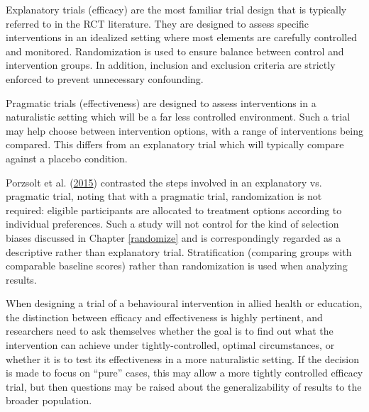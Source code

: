 \documentclass{krantz}
\begin{document}
Explanatory trials (efficacy) are the most familiar trial design that is typically referred to in the RCT literature. They are designed to assess specific interventions in an idealized setting where most elements are carefully controlled and monitored. Randomization is used to ensure balance between control and intervention groups. In addition, inclusion and exclusion criteria are strictly enforced to prevent unnecessary confounding.

Pragmatic trials (effectiveness) are designed to assess interventions in a naturalistic setting which will be a far less controlled environment. Such a trial may help choose between intervention options, with a range of interventions being compared. This differs from an explanatory trial which will typically compare against a placebo condition.

Porzsolt et al. (\protect\hyperlink{ref-porzsolt2015}{2015}) contrasted the steps involved in an explanatory vs. pragmatic trial, noting that with a pragmatic trial, randomization is not required: eligible participants are allocated to treatment options according to individual preferences. Such a study will not control for the kind of selection biases discussed in Chapter \ref{randomize} and is correspondingly regarded as a descriptive rather than explanatory trial. Stratification (comparing groups with comparable baseline scores) rather than randomization is used when analyzing results. 

When designing a trial of a behavioural intervention in allied health or education, the distinction between efficacy and effectiveness is highly pertinent, and researchers need to ask themselves whether the goal is to find out what the intervention can achieve under tightly-controlled, optimal circumstances, or whether it is to test its effectiveness in a more naturalistic setting. If the decision is made to focus on ``pure'' cases, this may allow a more tightly controlled efficacy trial, but then questions may be raised about the generalizability of results to the broader population.
\end{document}

